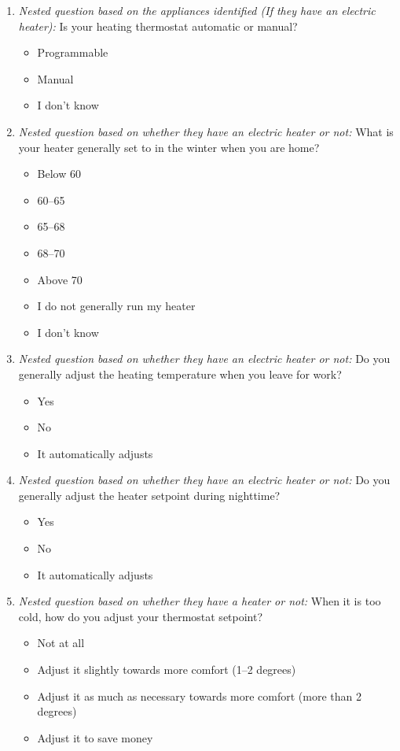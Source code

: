 \documentclass{article}
\begin{document}
\begin{enumerate}
\item \textit{Nested question based on the appliances identified (If they have an electric heater):}
Is your heating thermostat automatic or manual?
\begin{itemize}
  \item[\checkbox] Programmable
  \item[\checkbox] Manual
  \item[\checkbox] I don't know
\end{itemize}
 

\item \textit{Nested question based on whether they have an electric heater or not:}
What is your heater generally set to in the winter when you are home?
\begin{itemize}
  \item[\checkbox] Below 60
  \item[\checkbox] 60--65
  \item[\checkbox] 65--68
  \item[\checkbox] 68--70
  \item[\checkbox] Above 70
  \item[\checkbox] I do not generally run my heater
  \item[\checkbox] I don't know
\end{itemize}
 

\item \textit{Nested question based on whether they have an electric heater or not:}
Do you generally adjust the heating temperature when you leave for work?
\begin{itemize}
  \item[\checkbox] Yes
  \item[\checkbox] No
  \item[\checkbox] It automatically adjusts
\end{itemize}
 

\item \textit{Nested question based on whether they have an electric heater or not:}
Do you generally adjust the heater setpoint during nighttime?
\begin{itemize}
  \item[\checkbox] Yes
  \item[\checkbox] No
  \item[\checkbox] It automatically adjusts
\end{itemize}
 

\item \textit{Nested question based on whether they have a heater or not:}
When it is too cold, how do you adjust your thermostat setpoint?
\begin{itemize}
  \item[\checkbox] Not at all
  \item[\checkbox] Adjust it slightly towards more comfort (1--2 degrees)
  \item[\checkbox] Adjust it as much as necessary towards more comfort (more than 2 degrees)
  \item[\checkbox] Adjust it to save money
\end{itemize}
 


\end{enumerate}
\end{document}
